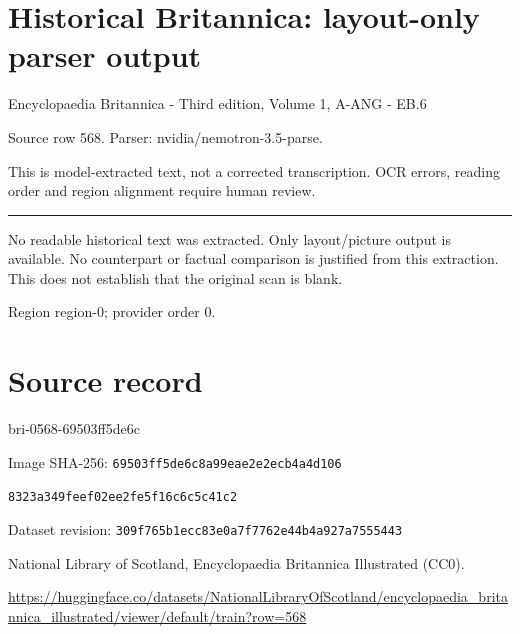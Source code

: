 \documentclass[11pt]{article}
\begin{document}
\section*{Historical Britannica: layout-only parser output}
Encyclopaedia Britannica - Third edition, Volume 1, A-ANG - EB.6\par
{\small Source row 568. Parser: nvidia/nemotron-3.5-parse.\par}
{\small This is model-extracted text, not a corrected transcription. OCR errors, reading order and region alignment require human review.\par}
\hrule\medskip
{\color{red} No readable historical text was extracted. Only layout/picture output is available. No counterpart or factual comparison is justified from this extraction. This does not establish that the original scan is blank.\par}


\par

{\scriptsize\color{gray} Region region-0; provider order 0.\par}
\medskip
\newpage\section*{Source record}
bri-0568-69503ff5de6c\par
Image SHA-256: \texttt{69503ff5de6c8a99eae2e2ecb4a4d106}\par\texttt{8323a349feef02ee2fe5f16c6c5c41c2}\par
Dataset revision: \texttt{309f765b1ecc83e0a7f7}\texttt{762e44b4a927a7555443}\par
National Library of Scotland, Encyclopaedia Britannica Illustrated (CC0).\par
\url{https://huggingface.co/datasets/NationalLibraryOfScotland/encyclopaedia_britannica_illustrated/viewer/default/train?row=568}
\end{document}
